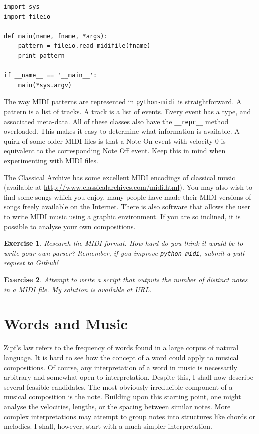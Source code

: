 \documentclass[10pt]{book}
\newtheorem{exercise}{Exercise}[chapter]
\begin{document}
\begin{verbatim}
import sys
import fileio

def main(name, fname, *args):
    pattern = fileio.read_midifile(fname)
    print pattern

if __name__ == '__main__':
    main(*sys.argv)

\end{verbatim}


The way MIDI patterns are represented in \texttt{python-midi} is straightforward. A pattern is a list of tracks. A track is a list of events. Every event has a type, and associated meta-data. All of these classes also have the \texttt{\_\_repr\_\_} method overloaded. This makes it easy to determine what information is available. A quirk of some older MIDI files is that a Note On event with velocity 0 is equivalent to the corresponding Note Off event. Keep this in mind when experimenting with MIDI files.

The Classical Archive has some excellent MIDI encodings of classical music (available at \url{http://www.classicalarchives.com/midi.html}). You may also wish to find some songs which you enjoy, many people have made their MIDI versions of songs freely available on the Internet. There is also software that allows the user to write MIDI music using a graphic environment. If you are so inclined, it is possible to analyse your own compositions.


\begin{exercise}
Research the MIDI format. How hard do you think it would be to write your own parser? Remember, if you improve \texttt{python-midi}, submit a pull request to Github!
\end{exercise}

\begin{exercise}
Attempt to write a script that outputs the number of distinct notes in a MIDI file. My solution is available at URL.
\end{exercise}


\section{Words and Music}

Zipf's law refers to the frequency of words found in a large corpus of natural language. It is hard to see how the concept of a word could apply to musical compositions. Of course, any interpretation of a word in music is necessarily arbitrary and somewhat open to interpretation. Despite this, I shall now describe several feasible candidates. The most obviously irreducible component of a musical composition is the note. Building upon this starting point, one might analyse the velocities, lengths, or the spacing between similar notes. More complex interpretations may attempt to group notes into structures like chords or melodies. I shall, however, start with a much simpler interpretation.
\end{document}
